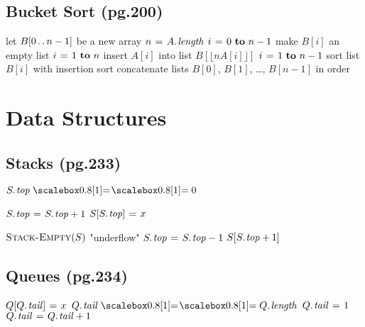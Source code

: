 \documentclass[twocolumn]{article}
\begin{document}
\subsection{Bucket Sort (pg.200)}
\begin{codebox}
\li let $B[0 \mathinner{\ldotp\ldotp} n-1]$ be a new array
\li $n \gets \attrib{A}{length}$
\li \For $i \gets 0 \To n-1$
\li \Do make $B[i]$ an empty list
	\End
\li \For $i \gets 1 \To n$
\li \Do insert $A[i]$ into list $B[\lfloor nA[i]\rfloor ]$
	\End
\li \For $i \gets 1 \To n-1$
\li \Do sort list $B[i]$ with insertion sort
	\End
\li concatenate lists $B[0]$, $B[1]$, \dots , $B[n-1]$ in order
\end{codebox}

\section{Data Structures}
\label{data_structures}
\subsection{Stacks (pg.233)}
\begin{codebox}
\li \If $\attrib{S}{top} \isequal 0$
\li \Then \Return {}
\li \Else \Return {}
	\End
\end{codebox}

\begin{codebox}
\li $\attrib{S}{top} \gets \attrib{S}{top}+1$
\li $S[\attrib{S}{top}] \gets x$
\end{codebox}

\begin{codebox}
\li \If $\textnormal{\scshape Stack-Empty}(S)$
\li \Then \Error "underflow"
\li \Else $\attrib{S}{top} \gets \attrib{S}{top}-1$
\li \Return $S[\attrib{S}{top}+1]$
	\End
\end{codebox}

\subsection{Queues (pg.234)}
\begin{codebox}
\li $Q[\attrib{Q}{tail}] \gets x$
\li \If $\attrib{Q}{tail} \isequal \attrib{Q}{length}$
\li \Then $\attrib{Q}{tail} \gets 1$
\li \Else $\attrib{Q}{tail} \gets \attrib{Q}{tail} + 1$
	\End
\end{codebox}
\end{document}
